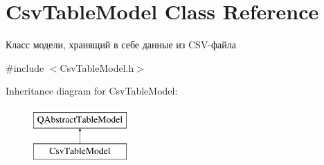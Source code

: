 \hypertarget{class_csv_table_model}{}\section{Csv\+Table\+Model Class Reference}
\label{class_csv_table_model}


Класс модели, хранящий в себе данные из C\+S\+V-\/файла  




{\ttfamily \#include $<$Csv\+Table\+Model.\+h$>$}

Inheritance diagram for Csv\+Table\+Model\+:\begin{figure}[H]
\begin{center}
\leavevmode
\includegraphics[height=2.000000cm]{class_csv_table_model}
\end{center}
\end{figure}
